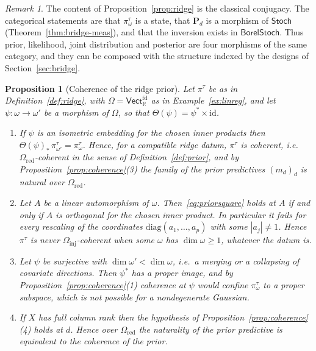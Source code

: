 \documentclass[11pt,a4paper]{article}
\theoremstyle{plain}
\newtheorem{proposition}[theorem]{Proposition}
\theoremstyle{definition}
\theoremstyle{remark}
\newtheorem{remark}[theorem]{Remark}
\newcommand{\cat}[1]{\mathsf{#1}}
\newcommand{\catO}{\cat{\Omega}}
\newcommand{\Stoch}{\cat{Stoch}}
\newcommand{\id}{\mathrm{id}}
\newcommand{\R}{\mathbb{R}}
\newcommand{\Vect}{\cat{Vect}}
\newcommand{\BorelStoch}{\cat{BorelStoch}}
\begin{document}
\begin{remark}\label{rem:ridge}
The content of Proposition~\ref{prop:ridge} is the classical conjugacy. The
categorical statements are that $\pi^{\tau}_{\omega}$ is a state, that
$\mathbf{P}_{d}$ is a morphism of $\Stoch$ (Theorem~\ref{thm:bridge-meas}), and
that the inversion exists in $\BorelStoch$. Thus prior, likelihood, joint
distribution and posterior are four morphisms of the same category, and they
can be composed with the structure indexed by the designs of
Section~\ref{sec:bridge}.
\end{remark}

\begin{proposition}[Coherence of the ridge prior]\label{prop:ridgecoherence}
Let $\pi^{\tau}$ be as in Definition~\ref{def:ridge}, with
$\catO = \Vect^{\mathrm{fd}}_{\R}$ as in Example~\ref{ex:linreg}, and let
$\psi \colon \omega \to \omega'$ be a morphism of $\catO$, so that
$\Theta(\psi) = \psi^{*}\times\id$.
\begin{enumerate}
\item If $\psi$ is an isometric embedding for the chosen inner products then
$\Theta(\psi)_{*}\,\pi^{\tau}_{\omega'} = \pi^{\tau}_{\omega}$. Hence, for a
compatible ridge datum, $\pi^{\tau}$ is coherent, i.e.\
$\catO_{\mathrm{red}}$-coherent in the sense of Definition~\ref{def:prior},
and by Proposition~\ref{prop:coherence}(3) the family of the prior predictives
$(m_{d})_{d}$ is natural over $\catO_{\mathrm{red}}$.
\item Let $A$ be a linear automorphism of $\omega$.
Then~\eqref{eq:priorsquare} holds at $A$ if and only if $A$ is orthogonal for
the chosen inner product. In particular it fails for every rescaling of the
coordinates $\mathrm{diag}(a_{1},\dots,a_{p})$ with some $|a_{j}| \neq 1$.
Hence $\pi^{\tau}$ is never $\catO_{\mathrm{inj}}$-coherent when some $\omega$
has $\dim\omega \ge 1$, whatever the datum is.
\item Let $\psi$ be surjective with $\dim\omega' < \dim\omega$, i.e.\ a merging
or a collapsing of covariate directions. Then $\psi^{*}$ has a proper image,
and by Proposition~\ref{prop:coherence}(1) coherence at $\psi$ would confine
$\pi^{\tau}_{\omega}$ to a proper subspace, which is not possible for a
nondegenerate Gaussian.
\item If $X$ has full column rank then the hypothesis of
Proposition~\ref{prop:coherence}(4) holds at $d$. Hence over
$\catO_{\mathrm{red}}$ the naturality of the prior predictive is equivalent to
the coherence of the prior.
\end{enumerate}
\end{proposition}
\end{document}
